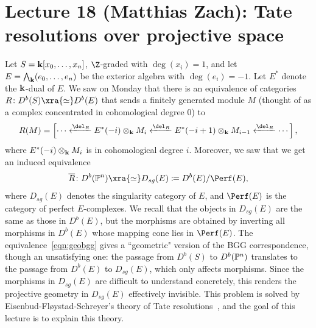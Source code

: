 \documentclass{amsart}
\begin{document}
\fi

\section{Lecture 18 (Matthias Zach): Tate resolutions over projective space}\label{lec:18-tate-resolutions-PPn}

Let $S = \mathbf{k}[x_0, \dots, x_n]$, $\Z$-graded with $\deg(x_i) = 1$, and let $E = \bigwedge_{\mathbf{k}}(e_0, \dots, e_n)$ be the exterior algebra with $\deg(e_i) = -1$. Let $E^*$ denote the $\mathbf{k}$-dual of $E$. We saw on Monday that there is an equivalence of categories
$
R \co D^b(S) \xra{\simeq} D^b(E)
$
that sends a finitely generated module $M$ (thought of as a complex concentrated in cohomological degree 0) to
\begin{equation}
\label{eqn:RMformula}
R(M) = \left[\cdots \xla{\del_R} E^*(-i) \otimes_\k M_{i} \xla{\del_R} E^*(-i + 1) \otimes_\k M_{i - 1} \xla{\del_R} \cdots \right],
\end{equation}
where $E^*(-i) \otimes_{\mathbf{k}} M_{i}$ is in cohomological degree $i$. Moreover, we saw that we get an induced equivalence
\begin{equation}
\label{eqn:geobgg}
\overline{R} \co D^b(\PP^n) \xra{\simeq} D_{sg}(E) \ce D^b(E) / \Perf(E),
\end{equation}
where $D_{sg}(E)$ denotes the singularity category of $E$, and $\Perf(E)$ is the category of perfect $E$-complexes. We recall that the objects in $D_{sg}(E)$ are the same as those in $D^b(E)$, but the morphisms are obtained by inverting all morphisms in $D^b(E)$ whose mapping cone lies in $\Perf(E)$. The equivalence~\eqref{eqn:geobgg} gives a ``geometric" version of the BGG correspondence, though an unsatisfying one: the passage from $D^b(S)$ to $D^b(\mathbb P^n)$ translates to the passage from $D^b(E)$ to $D_{sg}(E)$, which only affects morphisms. Since the morphisms in $D_{sg}(E)$ are difficult to understand concretely, this renders the projective geometry in $D_{sg}(E)$ effectively invisible. This problem is solved by Eisenbud-Fl\o ystad-Schreyer's theory of Tate resolutions~\cite{EFS03}, and the goal of this lecture is to explain this theory.
\end{document}
